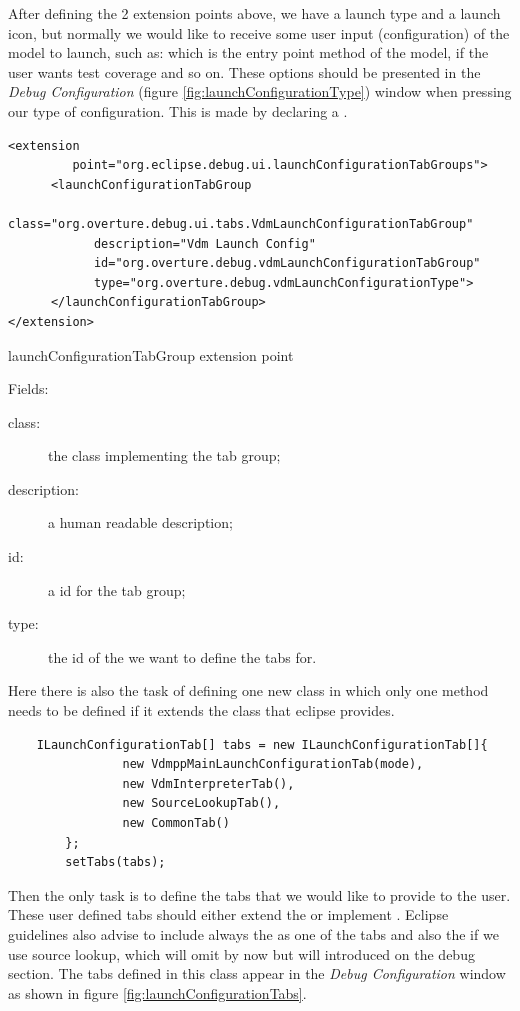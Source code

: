 After defining the 2 extension points above, we have a launch type and a launch icon, but normally we would like to receive some user input (configuration) of the model to launch, such as: which is the entry point method of the model, if the user wants test coverage and so on. These options should be presented in the \textit{Debug Configuration} (figure \ref{fig:launchConfigurationType}) window when pressing our type of configuration. This is made by declaring a .
\begin{program}
\scriptsize
\begin{verbatim}
<extension
         point="org.eclipse.debug.ui.launchConfigurationTabGroups">
      <launchConfigurationTabGroup
            class="org.overture.debug.ui.tabs.VdmLaunchConfigurationTabGroup"
            description="Vdm Launch Config"
            id="org.overture.debug.vdmLaunchConfigurationTabGroup"
            type="org.overture.debug.vdmLaunchConfigurationType">
      </launchConfigurationTabGroup>
</extension>
\end{verbatim}
\caption{launchConfigurationTabGroup extension point}
\normalsize
\end{program}
Fields:
\begin{description}
\item[class:] the class implementing the tab group;

\item[description:] a human readable description;

\item[id:] a id for the tab group;

\item[type:] the id of the  we want to define the tabs for.
\end{description}

Here there is also the task of defining one new class  in which only one method needs to be defined if it extends the  class that eclipse provides.

\begin{lstlisting}
	ILaunchConfigurationTab[] tabs = new ILaunchConfigurationTab[]{
				new VdmppMainLaunchConfigurationTab(mode),
				new VdmInterpreterTab(),
				new SourceLookupTab(),
				new CommonTab()
		};
		setTabs(tabs);	
\end{lstlisting}
Then the only task is to define the tabs that we would like to provide to the user. These user defined tabs should either extend the  or implement . Eclipse guidelines also advise to include always the  as one of the tabs and also the  if we use source lookup, which will omit by now but will introduced on the debug section. The tabs defined in this class appear in the \textit{Debug Configuration} window as shown in figure \ref{fig:launchConfigurationTabs}.

